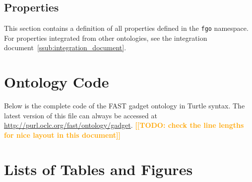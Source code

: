 \documentclass[twoside]{fast_latex}
\newcommand{\todo}[1]{\textsf{\textbf{\textcolor{Orange}{[[TODO: #1]]}}}}
\newcommand{\todo}[1]{}
\begin{document}
\singlespacing
\begin{small}

\end{small}
\doublespacing


\subsection{Properties} %
\label{sub:properties}

This section contains a definition of all properties defined in the \texttt{fgo} namespace. For properties integrated from other ontologies, see the integration document~\ref{ssub:integration_document}.

\singlespacing
\begin{small}

\end{small}
\doublespacing



\clearpage
{}
\section{Ontology Code}
\label{sec:ontology_code}

Below is the complete code of the FAST gadget ontology in Turtle syntax. The latest version of this file can always be accessed at \url{http://purl.oclc.org/fast/ontology/gadget}.
\todo{check the line lengths for nice layout in this document}

\singlespacing
% 



\clearpage
\doublespacing
{}
\section*{Lists of Tables and Figures}

\listoftables
\listoffigures

\clearpage
{}


\end{document}
